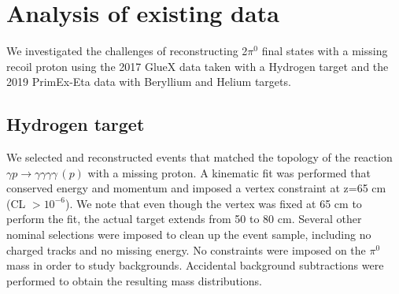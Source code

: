 
\section{Analysis of existing data}
We investigated the challenges of reconstructing 2$\pi^0$ final states
with a missing recoil proton using the 2017 GlueX data taken with a
Hydrogen target and the 2019 PrimEx-Eta data with Beryllium and Helium targets.
\subsection{Hydrogen target}
  We selected and reconstructed events that matched the
topology of the reaction $\gamma p\rightarrow \gamma \gamma \gamma
\gamma\, (p)$ with a missing proton. A kinematic fit was performed
that conserved energy and momentum and imposed a vertex constraint at
z=65 cm (CL $> 10^{-6}$). We note that even though the vertex was
fixed at 65 cm to perform the fit, the actual target extends from 50
to 80 cm. Several other nominal selections were imposed to clean up
the event sample, including no charged tracks and no missing
energy. No constraints were imposed on the $\pi^0$ mass in order to
study backgrounds. Accidental background subtractions were performed
to obtain the resulting mass distributions.
